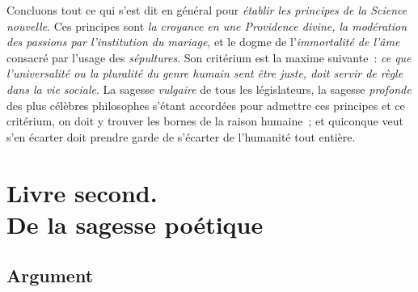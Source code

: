 \documentclass[french,twoside]{book} %
\newcommand\chapteropen{} %
\newcommand\chaptercont{} %
\newcommand\chapterclose{} %
\begin{document}
Concluons tout ce qui s’est dit en général pour {\itshape établir les principes de la Science nouvelle}. Ces principes sont {\itshape la croyance en une Providence divine, la modération des passions par l’institution du mariage}, et le dogme de l’{\itshape immortalité de l’âme} consacré par l’usage des {\itshape sépultures}. Son critérium est la maxime suivante : {\itshape ce que l’universalité ou la pluralité du genre humain sent être juste, doit servir de règle dans la vie sociale}. La sagesse {\itshape vulgaire} de tous les législateurs, la sagesse {\itshape profonde} des plus célèbres philosophes s’étant accordées pour admettre ces principes et ce critérium, on doit y trouver les bornes de la raison humaine ; et quiconque veut s’en écarter doit prendre garde de s’écarter de l’humanité tout entière.
\chapterclose

\chapterclose


\chapteropen
\part[{Livre second. De la sagesse poétique}]{Livre second. \\
De la sagesse poétique}

\chaptercont

\chapteropen
\chapter[{Argument}]{Argument}
\end{document}
